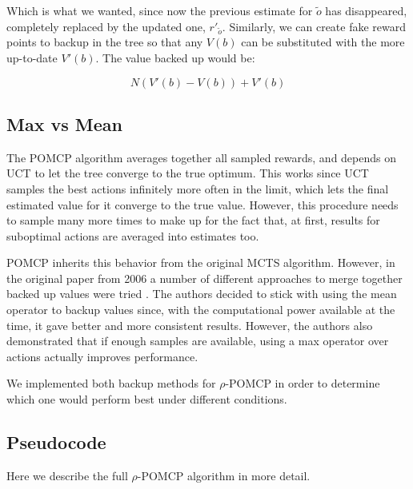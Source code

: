 Which is what we wanted, since now the previous estimate for $\tilde{o}$ has disappeared, completely
replaced by the updated one, $r'_{\tilde{o}}$. Similarly, we can create fake reward points to backup
in the tree so that any $V(b)$ can be substituted with the more up-to-date $V'(b)$. The value backed
up would be:

\[ N ( V'(b) - V(b) ) + V'(b) \]

%

\subsection{Max vs Mean}

The POMCP algorithm averages together all sampled rewards, and depends on UCT to let the tree
converge to the true optimum. This works since UCT samples the best actions infinitely more often in
the limit, which lets the final estimated value for it converge to the true value. However, this
procedure needs to sample many more times to make up for the fact that, at first, results for
suboptimal actions are averaged into estimates too.

POMCP inherits this behavior from the original MCTS algorithm. However, in the original paper from
2006 a number of different approaches to merge together backed up values were tried
\cite{cit:mcts}. The authors decided to stick with using the mean operator to backup values since,
with the computational power available at the time, it gave better and more consistent results.
However, the authors also demonstrated that if enough samples are available, using a max operator
over actions actually improves performance.

We implemented both backup methods for $\rho$-POMCP in order to determine which one would perform
best under different conditions.

\subsection{Pseudocode}

Here we describe the full $\rho$-POMCP algorithm in more detail.

